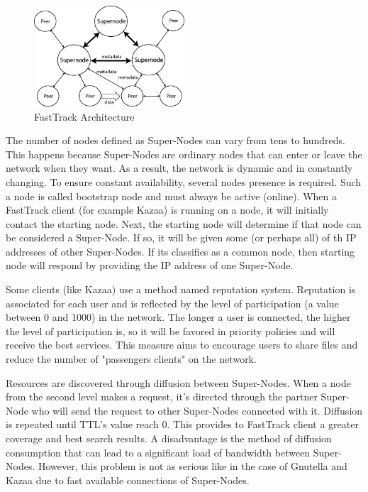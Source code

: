 \begin{figure}
  \centering
  \includegraphics[width=0.5\textwidth]{src/img/p2p-systems/fasttrack}
  \caption{FastTrack Architecture}
  \label{fig:p2p-systems:fasttrack}
\end{figure}

The number of nodes defined as Super-Nodes can vary from tens to hundreds.
This happens because Super-Nodes are ordinary nodes that can enter or leave the
network when they want. As a result, the network is dynamic and in constantly
changing. To ensure constant availability, several nodes presence is required.
Such a node is called bootstrap node and must always be active (online). When
a FastTrack client (for example Kazaa) is running on a node, it will initially
contact the starting node. Next, the starting node will determine if that node
can be considered a Super-Node. If so, it will be given some (or perhaps all)
of th IP addresses of other Super-Nodes. If its classifies as a common node,
then starting node will respond by providing the IP address of one Super-Node.

Some clients (like Kazaa) use a method named reputation system. Reputation is
associated for each user and is reflected by the level of participation (a value
between 0 and 1000) in the network. The longer a user is connected, the higher
the level of participation is, so it will be favored in priority policies and
will receive the best services. This measure aims to encourage users to share
files and reduce the number of "passengers clients" on the network.

Resources are discovered through diffusion between Super-Nodes. When a node from
the second level makes a request, it's directed through the partner Super-Node
who will send the request to other Super-Nodes connected with it. Diffusion is
repeated until TTL's value reach 0. This provides to FastTrack client a greater
coverage and best search results. A disadvantage is the method of diffusion
consumption that can lead to a significant load of bandwidth between Super-Nodes.
However, this problem is not as serious like in the case of Gnutella and Kazaa
due to fast available connections of Super-Nodes.


